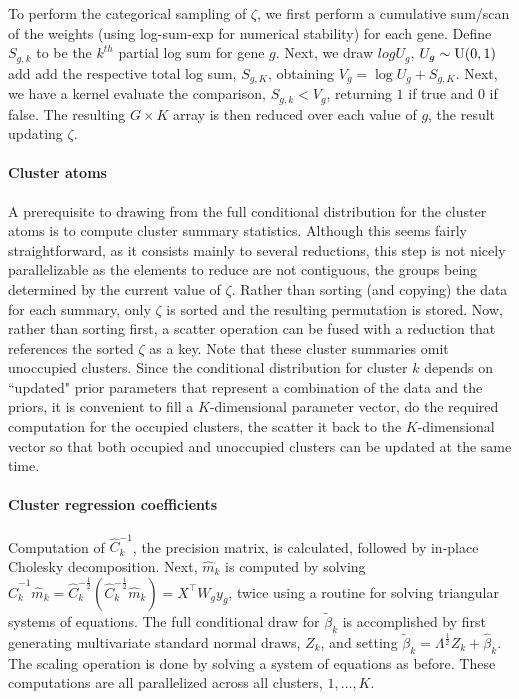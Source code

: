 To perform the categorical sampling of $\zeta$, we first perform a cumulative sum/scan of the weights (using log-sum-exp for numerical stability) for each gene. Define $S_{g,k}$ to be the $k^{th}$ partial log sum for gene $g$. Next, we draw $log U_g$, $U_g \sim \operatorname{U}(0,1)$ add add the respective total log sum, $S_{g,K}$, obtaining $V_g = \log U_g + S_{g,K}$. Next, we have a kernel evaluate the comparison, $S_{g,k}<V_g$, returning $1$ if true and $0$ if false. The resulting $G\times K$ array is then reduced over each value of $g$, the result updating $\zeta$.

\paragraph{Cluster atoms}
A prerequisite to drawing from the full conditional distribution for the cluster atoms is to compute cluster summary statistics. Although this seems fairly straightforward, as it consists mainly to several reductions, this step is not nicely parallelizable as the elements to reduce are not contiguous, the groups being determined by the current value of $\zeta$. Rather than sorting (and copying) the data for each summary, only $\zeta$ is sorted and the resulting permutation is stored. Now, rather than sorting first, a scatter operation can be fused with a reduction that references the sorted $\zeta$ as a key. Note that these cluster summaries omit unoccupied clusters. Since the conditional distribution for cluster $k$ depends on ``updated" prior parameters that represent a combination of the data and the priors, it is convenient to fill a $K$-dimensional parameter vector, do the required computation for the occupied clusters, the scatter it back to the $K$-dimensional vector so that both occupied and unoccupied clusters can be updated at the same time.

\paragraph{Cluster regression coefficients}
Computation of
$\hat{C}_k^{-1}$, the precision matrix, is calculated, followed
by in-place Cholesky decomposition. Next, $\hat{m}_k$ is computed
by solving
$\hat{C}_k^{-1}\hat{m}_k=\hat{C}_k^{-\frac{1}{2}}\left(\hat{C}_k^{-\frac{1}{2}}\hat{m}_k\right)
= X^\top W_g y_g$, twice using a routine for solving triangular
systems of equations. The full conditional draw for $\tilde{\beta}_k$ is
accomplished by first generating multivariate standard normal draws, $Z_k$, and setting $\tilde{\beta}_k =
\Lambda^{\frac{1}{2}} Z_k + \hat{\beta}_k$. The scaling operation is
done by solving a system of equations as before. These
computations are all parallelized across all clusters, $1,\ldots,K$.

